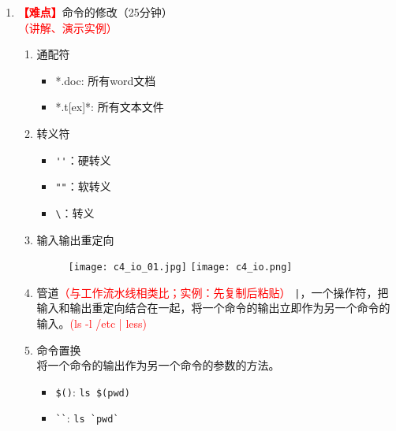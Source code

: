 \documentclass{TIJMUjiaoanLL}
\begin{document}
\begin{enumerate}
    \item \textcolor{red}{\textbf{【难点】}}命令的修改（25分钟）\\ \textcolor{red}{（讲解、演示实例）}
    \begin{enumerate}
      \item 通配符
	\begin{itemize}
	  \item *.doc: 所有word文档
	  \item *.t[ex]*: 所有文本文件
	\end{itemize}
      \item 转义符
	\begin{itemize}
	  \item \verb|''|：硬转义
	  \item \verb|""|：软转义
	  \item \verb|\|：转义
	\end{itemize}
      \item 输入输出重定向
        \vspace*{-10pt}
	\begin{figure}[h]
	  \centering
	  \texttt{[image: c4\_io\_01.jpg]}
	  \quad
	  \texttt{[image: c4\_io.png]}
	\end{figure}
        \vspace*{-10pt}

\otherTail
\newpage
\otherHeader

      \item 管道\textcolor{red}{（与工作流水线相类比；实例：先复制后粘贴）}
	\verb=|=，一个操作符，把输入和输出重定向结合在一起，将一个命令的输出立即作为另一个命令的输入。\textcolor{red}{(ls -l /etc | less)}
      \item 命令置换
	\\ 将一个命令的输出作为另一个命令的参数的方法。
	\begin{itemize}
	  \item \verb|$()|: \verb|ls $(pwd)|
	  \item \verb|``|: \verb|ls `pwd`|
	\end{itemize}
    \end{enumerate}


\end{enumerate}
\end{document}
